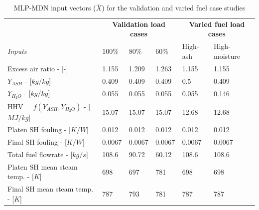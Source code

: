\documentclass[a4paper,fleqn]{cas-dc}
\begin{document}
\begin{table}[h!]
\caption{MLP-MDN input vectors ($\overline{X}$) for the validation and varied fuel case studies}\label{tbl_inputs}
\begin{tabular*}{\tblwidth}{lp{}p{}p{}p{}p{}}
\toprule
 & \multicolumn{3}{c}{\textbf{Validation load cases}}&\multicolumn{2}{c}{\textbf{Varied fuel load cases}}\\
\textit{Inputs}& 100\%  & 80\% & 60\% & High-ash & High-moisture  \\
\midrule
Excess air ratio - [-] & 1.155 & 1.209 & 1.263 & 1.155 & 1.155  \\
$Y_{ASH}$ - [$kg/kg$] & 0.409 & 0.409 &  0.409 &0.5 & 0.409  \\
$Y_{H_{2}O}$ - [$kg/kg$] & 0.055 & 0.055 & 0.055 & 0.055 & 0.146  \\
HHV = $f(Y_{ASH},Y_{H_{2}O})$ - [$MJ/kg$] & 15.07 & 15.07 & 15.07 & 12.68 & 12.68  \\
Platen SH fouling - [$K/W$]& 0.012 & 0.012 & 0.012 & 0.012 & 0.012  \\
Final SH fouling - [$K/W$] & 0.0067&0.0067 &0.0067 & 0.0067&0.0067  \\
Total fuel flowrate - [$kg/s$] &108.6 & 90.72 & 60.12 &108.6 & 108.6 \\
Platen SH mean steam temp. - [$K$] & 698 &697&781 &698 &698  \\
Final SH mean steam temp. - [$K$]& 787 & 793 &781 &787 &787  \\
\bottomrule
\end{tabular*}
\end{table}  
\end{document}
